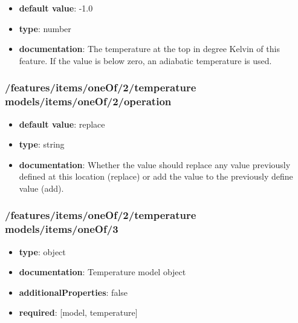 \begin{itemize}\item {\bf default value}: -1.0
\item {\bf type}: number
\item {\bf documentation}: The temperature at the top in degree Kelvin of this feature. If the value is below zero, an adiabatic temperature is used.
\end{itemize}\subsubsection{/features/items/oneOf/2/temperature models/items/oneOf/2/operation}
\begin{itemize}\item {\bf default value}: replace
\item {\bf type}: string
\item {\bf documentation}: Whether the value should replace any value previously defined at this location (replace) or add the value to the previously define value (add).
\end{itemize}\subsubsection{/features/items/oneOf/2/temperature models/items/oneOf/3}
\begin{itemize}\item {\bf type}: object
\item {\bf documentation}: Temperature model object
\item {\bf additionalProperties}: false
\item {\bf required}: [model, temperature]\end{itemize}
